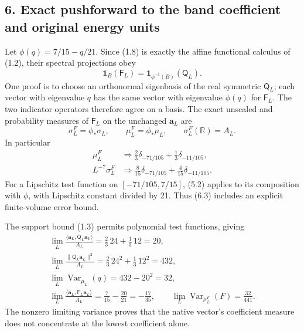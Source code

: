 \documentclass[
  11pt,
]{article}
\begin{document}
\subsection{6. Exact pushforward to the band coefficient and original
energy
units}\label{magnetic-part-8-exact-pushforward-to-the-band-coefficient-and-original-energy-units}

Let \(\phi(q)=7/15-q/21\). Since (1.8) is exactly the affine functional
calculus of (1.2), their spectral projections obey \[
\mathbf1_B(\mathsf F_L)=\mathbf1_{\phi^{-1}(B)}(\mathsf Q_L).
\tag{6.1}
\] One proof is to choose an orthonormal eigenbasis of the real
symmetric \(\mathsf Q_L\); each vector with eigenvalue \(q\) has the
same vector with eigenvalue \(\phi(q)\) for \(\mathsf F_L\). The two
indicator operators therefore agree on a basis. The exact unscaled and
probability measures of \(\mathsf F_L\) on the unchanged
\(\boldsymbol a_L\) are \[
\sigma_L^F=\phi_*\sigma_L,\qquad
\mu_L^F=\phi_*\mu_L,\qquad \sigma_L^F(\mathbb R)=A_L.
\tag{6.2}
\] In particular \[
\boxed{\begin{split}
\mu_L^F&\Longrightarrow
 \frac23\delta_{-71/105}+\frac13\delta_{-11/105},\\
L^{-7}\sigma_L^F&\Longrightarrow
 \frac8{15}\delta_{-71/105}+\frac4{15}\delta_{-11/105}.
\end{split}}
\tag{6.3}
\] For a Lipschitz test function on \([-71/105,7/15]\), (5.2) applies to
its composition with \(\phi\), with Lipschitz constant divided by 21.
Thus (6.3) includes an explicit finite-volume error bound.

The support bound (1.3) permits polynomial test functions, giving \[
\begin{gathered}
\lim_L\frac{\langle\boldsymbol a_L,\mathsf Q_L\boldsymbol a_L\rangle}{A_L}
 =\frac23\,24+\frac13\,12=20,\\
\lim_L\frac{\|\mathsf Q_L\boldsymbol a_L\|^2}{A_L}
 =\frac23\,24^2+\frac13\,12^2=432,\\
\lim_L\operatorname{Var}_{\mu_L}(q)=432-20^2=32,\\
\lim_L\frac{\langle\boldsymbol a_L,\mathsf F_L\boldsymbol a_L\rangle}{A_L}
 =\frac7{15}-\frac{20}{21}=-\frac{17}{35},\qquad
\lim_L\operatorname{Var}_{\mu_L^F}(F)=\frac{32}{441}.
\end{gathered}
\tag{6.4}
\] The nonzero limiting variance proves that the native vector's
coefficient measure does not concentrate at the lowest coefficient
alone.
\end{document}

